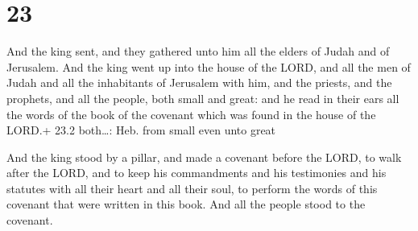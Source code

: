 \hypertarget{section-22}{%
\section{23}\label{section-22}}

 And the king sent, and they gathered unto him all the
elders of Judah and of Jerusalem.  And the king went up into
the house of the LORD, and all the men of Judah and all the inhabitants
of Jerusalem with him, and the priests, and the prophets, and all the
people, both small and great: and he read in their ears all the words of
the book of the covenant which was found in the house of the LORD.+ 23.2
both\ldots: Heb. from small even unto great

 And the king stood by a pillar, and made a covenant
before the LORD, to walk after the LORD, and to keep his commandments
and his testimonies and his statutes with all their heart and all their
soul, to perform the words of this covenant that were written in this
book. And all the people stood to the covenant.

